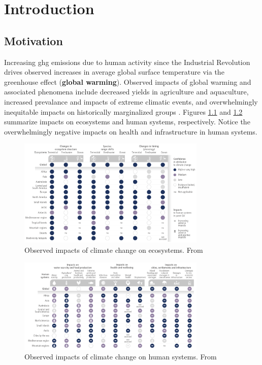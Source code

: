 \chapter{Introduction}%
\label{cha:introduction}

\section{Motivation}%
\label{sec:motivation}

Increasing \gls{ghg} emissions due to human activity since the Industrial
Revolution drives observed increases in average global surface temperature via
the greenhouse effect\cite{mitchell_greenhouse_1989}
\cite{paola_a_arias_2021_ts} (\textbf{global warming}).  Observed impacts of
global warming and associated phenomena include decreased yields in agriculture
and aquaculture, increased prevalance and impacts of extreme climatic events,
and overwhelmingly inequitable impacts on historically marginalized groups
\cite{hans_portner_2022_ts}. Figures \ref{fig:ipcc-ts3-a} and
\ref{fig:ipcc-ts3-b} summarize impacts on ecosystems and human systems,
respectively. Notice the overwhelmingly negative impacts on health and infrastructure in human systems.

\begin{figure}[htpb]
    \centering
    \includegraphics[width=0.8\textwidth]{figs/ipcc-ts3-a.png}
    \caption{Observed impacts of climate change on ecosystems. From \cite{hans_portner_2022_ts}}
    \label{fig:ipcc-ts3-a}
\end{figure}

\begin{figure}[htpb]
    \centering
    \includegraphics[width=0.8\textwidth]{figs/ipcc-ts3-b.png}
    \caption{Observed impacts of climate change on human systems. From \cite{hans_portner_2022_ts}}
    \label{fig:ipcc-ts3-b}
\end{figure}

